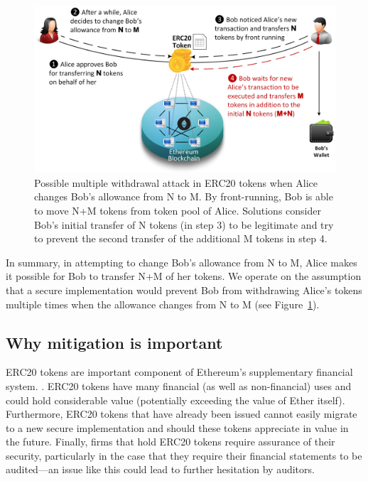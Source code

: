 \begin{figure}[ht]
	\centering
	\includegraphics[width=1.0\linewidth]{figures/multiple_withdrawal_02.png}
	\caption{Possible multiple withdrawal attack in ERC20 tokens when Alice changes Bob's allowance from N to M. By front-running, Bob is able to move N+M tokens from token pool of Alice. Solutions consider Bob's initial transfer of N tokens (in step 3) to be legitimate and try to prevent the second transfer of the additional M tokens in step 4.\label{fig:mwa}}
\end{figure}

In summary, in attempting to change Bob's allowance from N to M, Alice makes it possible for Bob to transfer N+M of her tokens. We operate on the assumption that a secure implementation would prevent Bob from withdrawing Alice's tokens multiple times when the allowance changes from N to M (see Figure~\ref{fig:mwa}).

\subsection{Why mitigation is important}

ERC20 tokens are important component of Ethereum's supplementary financial system. . ERC20 tokens have many financial (as well as non-financial) uses and could hold considerable value (potentially exceeding the value of Ether itself). Furthermore, ERC20 tokens that have already been issued cannot easily migrate to a new secure implementation and should these tokens appreciate in value in the future. Finally, firms that hold ERC20 tokens require assurance of their security, particularly in the case that they require their financial statements to be audited---an issue like this could lead to further hesitation by auditors.

